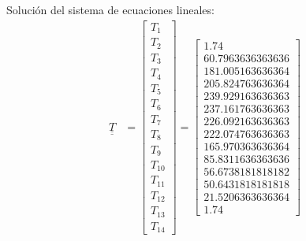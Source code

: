 \documentclass[10pt]{article}
\def\doubleunderline#1{\underline{\underline{#1}}}
\begin{document}
Soluci\'on del sistema de ecuaciones lineales:
\begin{align*}
\doubleunderline{T} &= \left[\begin{matrix}T_{1}\\T_{2}\\T_{3}\\T_{4}\\T_{5}\\T_{6}\\T_{7}\\T_{8}\\T_{9}\\T_{10}\\T_{11}\\T_{12}\\T_{13}\\T_{14}\end{matrix}\right] = \left[\begin{matrix} 1.74 \\ 60.7963636363636\\181.005163636364\\205.824763636364\\239.929163636363\\237.161763636363\\226.092163636363\\222.074763636363\\165.970363636364\\85.8311636363636\\56.6738181818182\\50.6431818181818\\21.5206363636364 \\ 1.74 \end{matrix}\right]	
\end{align*}
\end{document}
